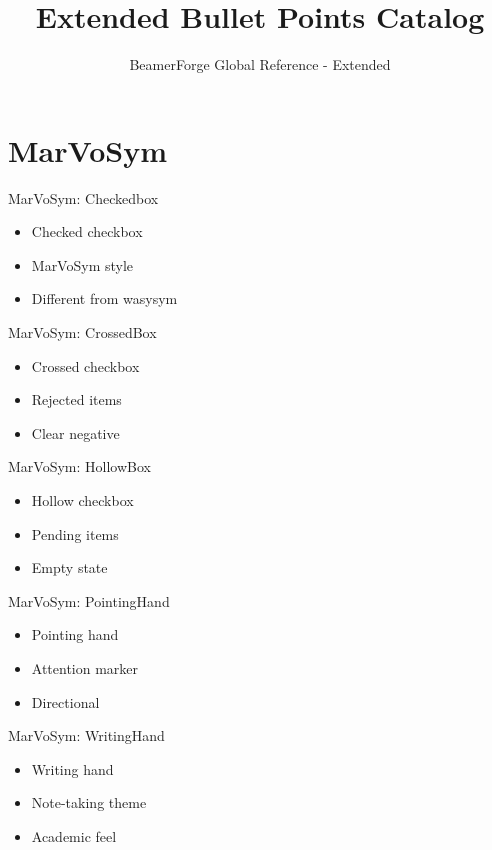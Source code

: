\documentclass[12pt]{beamer}
\title[]{Extended Bullet Points Catalog}
\subtitle{BeamerForge Global Reference - Extended}
\date{}
\begin{document}
\section{MarVoSym}

\begin{frame}{MarVoSym: Checkedbox}
\begin{itemize}
  \item Checked checkbox
  \item MarVoSym style
  \item Different from wasysym
\end{itemize}
\end{frame}

\begin{frame}{MarVoSym: CrossedBox}
\begin{itemize}
  \item Crossed checkbox
  \item Rejected items
  \item Clear negative
\end{itemize}
\end{frame}

\begin{frame}{MarVoSym: HollowBox}
\begin{itemize}
  \item Hollow checkbox
  \item Pending items
  \item Empty state
\end{itemize}
\end{frame}

\begin{frame}{MarVoSym: PointingHand}
\begin{itemize}
  \item Pointing hand
  \item Attention marker
  \item Directional
\end{itemize}
\end{frame}

\begin{frame}{MarVoSym: WritingHand}
\begin{itemize}
  \item Writing hand
  \item Note-taking theme
  \item Academic feel
\end{itemize}
\end{frame}
\end{document}
